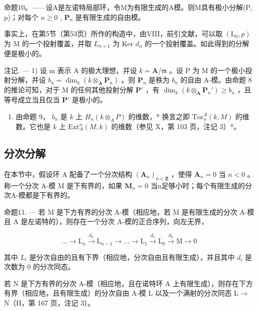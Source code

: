 命题10。——设A是左诺特局部环，令M为有限生成的A模。则M具有极小分解(P, p)；对每个 \(n \geqslant 0\) , \(\mathbf{P}_{n}\) 是有限生成的自由模。

事实上，在第5节（第53页）所作的构造中，由VIII，前引文献，可以取 \((\mathrm{L}_{0}, p)\) 为 M 的一个投射覆盖，并取 \(L_{n+1}\) 为 Ker \(d_{n}\) 的一个投射覆盖。如此得到的分解便是极小的。

注记. --- 1) 设 m 表示 A 的极大理想，并设 \(k = \mathbf{A}/\mathfrak{m}\) 。设 P 为 M 的一个极小投射分解，并设 \(b_{n} = \dim_{k}(k \otimes_{\mathbf{A}} \mathbf{P}_{n})\) 。则 \(\mathbf{P}_{n}\) 是秩为 \(b_{n}\) 的自由 A-模。由命题 8 的推论可知，对于 M 的任何其他投射分解 \(\mathbf{P}'\) ，有 \(\dim_{k}(k \otimes_{\mathbf{A}} \mathbf{P}_{n}') \geqslant b_{n}\) ，且等号成立当且仅当 \(\mathbf{P}'\) 是极小的。

\begin{enumerate}
\def\labelenumi{\arabic{enumi})}
\setcounter{enumi}{1}
\tightlist
\item
  由命题 9， \(b_n\) 是 \(k\) 上 \(H_n(k \otimes_A P)\) 的维数，* 换言之即 \(\text{Tor}_n^A(k, M)\) 的维数。它也是 \(k\) 上 \(\text{Ext}_A^n(M, k)\) 的维数（参见 X，第 103 页，注记 3）*。
\end{enumerate}

\subsection{分次分解}

在本节中，假设环 A 配备了一个分次结构 \((\mathbf{A}_n)_{n\in \mathbf{Z}}\) ，使得 \(\mathbf{A}_n = 0\) 当 \(n < 0\) 。称一个分次 A-模 M 是下有界的，如果 \(\mathbf{M}_n = 0\) 当n足够小时；每个有限生成的分次A-模都是下有界的。

命题11. --- 若 M 是下方有界的分次 A-模（相应地，若 M 是有限生成的分次 A-模且 A 是左诺特的），则存在一个分次 A-模的正合序列，向左无界，

\[
\dots \longrightarrow \mathrm{L} _ {n} \xrightarrow {d _ {n}} \mathrm{L} _ {n - 1} \longrightarrow \dots \longrightarrow \mathrm{L} _ {1} \xrightarrow {d _ {1}} \mathrm{L} _ {0} \xrightarrow {d _ {0}} \mathrm{M} \longrightarrow 0
\]

其中 \(L_{i}\) 是分次自由的且有下界（相应地，分次自由且有限生成），并且其中 \(d_{i}\) 是次数为 0 的分次同态。

若 N 是下方有界的分次 A-模（相应地，且在诺特环 A 上有限生成），则存在下方有界（相应地，且有限生成）的分次自由 A-模 L 以及一个满射的分次同态 L → N（II，第 167 页，注记 3）。

